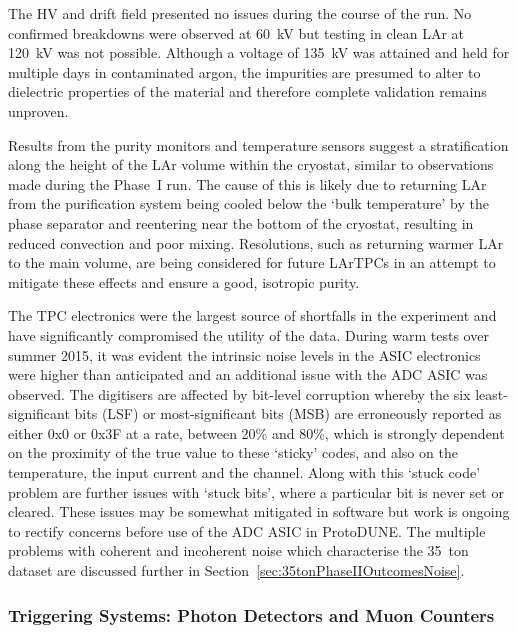 The HV and drift field presented no issues during the course of the run.  No confirmed breakdowns were observed at 60~kV but testing in clean LAr at 120~kV was not possible.  Although a voltage of 135~kV was attained and held for multiple days in contaminated argon, the impurities are presumed to alter to dielectric properties of the material and therefore complete validation remains unproven.

Results from the purity monitors and temperature sensors suggest a stratification along the height of the LAr volume within the cryostat, similar to observations made during the Phase~I run.  The cause of this is likely due to returning LAr from the purification system being cooled below the `bulk temperature' by the phase separator and reentering near the bottom of the cryostat, resulting in reduced convection and poor mixing.  Resolutions, such as returning warmer LAr to the main volume, are being considered for future LArTPCs in an attempt to mitigate these effects and ensure a good, isotropic purity.

The TPC electronics were the largest source of shortfalls in the experiment and have significantly compromised the utility of the data.  During warm tests over summer 2015, it was evident the intrinsic noise levels in the ASIC electronics were higher than anticipated and an additional issue with the ADC ASIC was observed.  The digitisers are affected by bit-level corruption whereby the six least-significant bits (LSF) or most-significant bits (MSB) are erroneously reported as either 0x0 or 0x3F at a rate, between 20\% and 80\%, which is strongly dependent on the proximity of the true value to these `sticky' codes, and also on the temperature, the input current and the channel.  Along with this `stuck code' problem are further issues with `stuck bits', where a particular bit is never set or cleared.  These issues may be somewhat mitigated in software but work is ongoing to rectify concerns before use of the ADC ASIC in ProtoDUNE.  The multiple problems with coherent and incoherent noise which characterise the 35~ton dataset are discussed further in Section~\ref{sec:35tonPhaseIIOutcomesNoise}.

\subsubsection{Triggering Systems: Photon Detectors and Muon Counters}\label{sec:35tonPhaseIIOutcomesTriggeringSystems}

